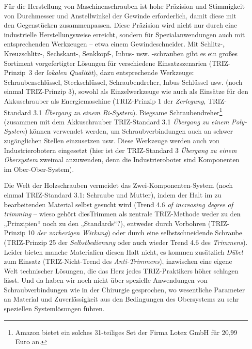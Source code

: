 \documentclass[11pt,a4paper]{article}
\begin{document}
Für die Herstellung von Maschinenschrauben ist hohe Präzision und Stimmigkeit
von Durchmesser und Anstellwinkel der Gewinde erforderlich, damit diese mit
den Gegenstücken zusammenpassen.  Diese Präzision wird nicht nur durch eine
industrielle Herstellungsweise erreicht, sondern für Spezialanwendungen auch
mit entsprechenden Werkzeugen -- etwa einem Gewindeschneider.  Mit Schlitz-,
Kreuzschlitz-, Sechskant-, Senkkopf-, Inbus- usw. -schrauben gibt es ein
großes Sortiment vorgefertigter Lösungen für verschiedene Einsatzszenarien
(TRIZ-Prinzip~3 der \emph{lokalen Qualität}), dazu entsprechende Werkzeuge:
Schraubenschlüssel, Steckschlüssel, Schraubendreher, Inbus-Schlüssel
usw. (noch einmal TRIZ-Prinzip 3), sowohl als Einzelwerkzeuge wie auch als
Einsätze für den Akkuschrauber als Energiemaschine (TRIZ-Prinzip 1 der
\emph{Zerlegung}, TRIZ-Standard 3.1 \emph{Übergang zu einem Bi-System}).
Biegsame Schraubendreher\footnote{Amazon bietet ein solches 31-teiliges Set
  der Firma Lotex GmbH für 20,99 Euro an.} (zusammen mit dem Akkuschrauber
TRIZ-Standard 3.1 \emph{Übergang zu einem Poly-System}) können verwendet
werden, um Schraubverbindungen auch an schwer zugänglichen Stellen einzusetzen
usw.  Diese Werkzeuge werden auch von Industrierobotern eingesetzt (hier ist
der TRIZ-Standard 3 \emph{Übergang zu einem Obersystem} zweimal anzuwenden,
denn die Industrieroboter sind Komponenten im Ober-Ober-System).

Die Welt der Holzschrauben vermeidet das Zwei-Komponenten-System (noch einmal
TRIZ-Standard 3.1: Schraube und Mutter), indem der Halt im zu bearbeitenden
Material selbst gesucht wird (Trend 4.6 \emph{of increasing degree of
  trimming} -- wieso gehört diesTrimmen als zentrale TRIZ-Methode weder zu den
„Prinzipien“ noch zu den „Standards“?), entweder durch Vorbohren (TRIZ-Prinzip
10 \emph{der vorherigen Wirkung}) oder durch eine selbstschneidende Schraube
(TRIZ-Prinzip 25 der \emph{Selbstbedienung} oder auch wieder Trend 4.6 des
\emph{Trimmens}). Leider bieten manche Materialien diesen Halt nicht, es
kommen zusätzlich \emph{Dübel} zum Einsatz (TRIZ-Nicht-Trend des
\emph{Anti-Trimmens}), inzwischen eine eigene Welt technischer Lösungen, die
das Herz jedes TRIZ-Praktikers höher schlagen lässt.  Und da haben wir noch
nicht über spezielle Anwendungen von Schraubverbindungen wie in der Chirurgie
gesprochen, wo wesentliche Parameter an Material und Zuverlässigkeit aus den
Bedingungen des Obersystems zu sehr speziellen Systemlösungen führen.
\end{document}
